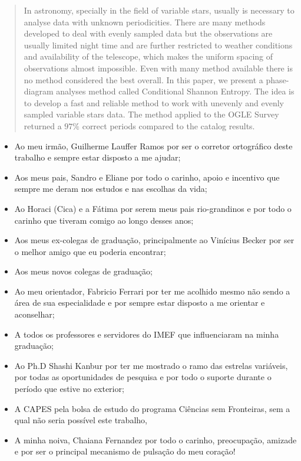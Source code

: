 \documentclass[
12pt, %
english, brazil, %
doublespacing,
nolistspacing, %
liststotoc, %
]{MastersDoctoralThesis} %
\begin{document}
\begin{abstract}
\addchaptertocentry{\abstractname}

In astronomy, specially in the field of variable stars, usually is necessary to analyse data with unknown periodicities. There are many methods developed to deal with evenly sampled data but the observations are usually limited night time and are further restricted to weather conditions and availability of the telescope, which makes the uniform spacing of observations almost impossible. Even with many method available there is no method considered the best overall. In this paper, we present a phase-diagram analyses method called Conditional Shannon Entropy. The idea is to develop a fast and reliable method to work with unevenly and evenly sampled variable stars data. The method applied to the OGLE Survey returned a $97\%$ correct periods compared to the catalog results.
\end{abstract}


\begin{acknowledgements}
\addchaptertocentry{\acknowledgementname} %

\begin{itemize}
\item Ao meu irmão, Guilherme Lauffer Ramos por ser o corretor ortográfico deste trabalho e sempre estar disposto a me ajudar;
\item Aos meus pais, Sandro e Eliane por todo o carinho, apoio e incentivo que sempre me deram nos estudos e nas escolhas da vida;
\item Ao Horaci (Cica) e a Fátima por serem meus pais rio-grandinos e por todo o carinho que tiveram comigo ao longo desses anos;
\item Aos meus ex-colegas de graduação, principalmente ao Vinícius Becker por ser o melhor amigo que eu poderia encontrar;
\item Aos meus novos colegas de graduação;
\item Ao meu orientador, Fabricio Ferrari por ter me acolhido mesmo não sendo a área de sua especialidade e por sempre estar disposto a me orientar e aconselhar;
\item A todos os professores e servidores do IMEF que influenciaram na minha graduação;
\item Ao Ph.D Shashi Kanbur por ter me mostrado o ramo das estrelas variáveis, por todas as oportunidades de pesquisa e por todo o suporte  durante o período que estive no exterior;
\item A CAPES pela bolsa de estudo do programa Ciências sem Fronteiras, sem a qual não seria possível este trabalho,
\item A minha noiva, Chaiana Fernandez por todo o carinho, preocupação, amizade e por ser o principal mecanismo de pulsação do meu coração!
\end{itemize}

\end{acknowledgements}
\end{document}
